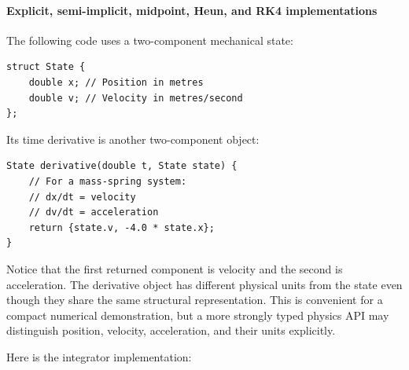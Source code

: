 \paragraph{Explicit, semi-implicit, midpoint, Heun, and RK4 implementations}\label{02-foundations-ii-ch025-explicit-semi-implicit-midpoint-heun-and-rk4-implementations}

The following code uses a two-component mechanical state:

\begin{verbatim}
struct State {
    double x; // Position in metres
    double v; // Velocity in metres/second
};
\end{verbatim}

Its time derivative is another two-component object:

\begin{verbatim}
State derivative(double t, State state) {
    // For a mass-spring system:
    // dx/dt = velocity
    // dv/dt = acceleration
    return {state.v, -4.0 * state.x};
}
\end{verbatim}

Notice that the first returned component is velocity and the second is acceleration. The derivative object has different physical units from the state even though they share the same structural representation. This is convenient for a compact numerical demonstration, but a more strongly typed physics API may distinguish position, velocity, acceleration, and their units explicitly.

Here is the integrator implementation:

